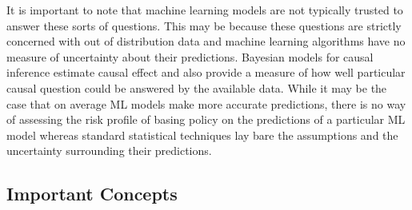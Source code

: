 \documentclass{article}
\begin{document}
        It is important to note that machine learning models are not typically trusted to answer these sorts of questions.
        This may be because these questions are strictly concerned with out of distribution data and machine learning
        algorithms have no measure of uncertainty about their predictions. Bayesian models for causal inference estimate
        causal effect and also provide a measure of how well particular causal question could be answered
        by the available data. While it may be the case that on average ML models make more accurate predictions, there is no way of 
        assessing the risk profile of basing policy on the predictions of a particular ML model whereas standard
        statistical techniques lay bare the assumptions and the uncertainty surrounding their predictions.


    \subsection*{Important Concepts}
\end{document}
